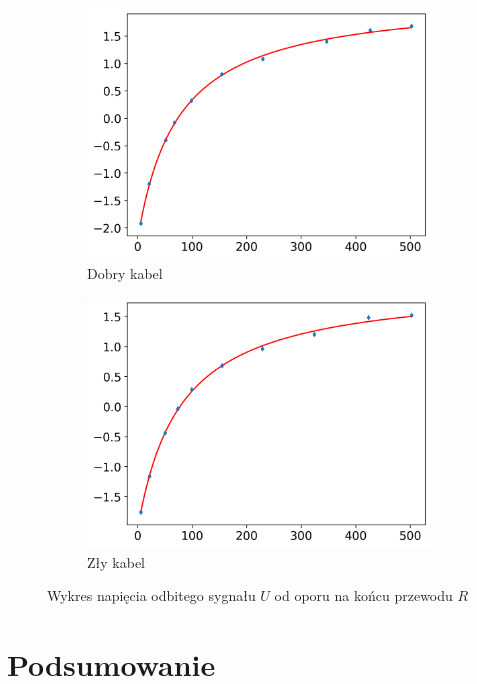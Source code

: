 \documentclass[12pt]{article}
\begin{document}
\begin{figure}[H]
  \centering
  \begin{subfigure}{0.45\textwidth}
    \includegraphics[width=\linewidth]{good_cable_voltage}
    \caption{Dobry kabel}
    \label{fig:good_distance}
  \end{subfigure}\hfill
  \begin{subfigure}{0.45\textwidth}
    \includegraphics[width=\linewidth]{bad_cable_voltage}
    \caption{Zły kabel}
    \label{fig:bad_distance}
  \end{subfigure}
  \caption{Wykres napięcia odbitego sygnału \(U\) od oporu na końcu przewodu \(R\)}
  \label{fig:distance}
\end{figure}

\section{Podsumowanie}
\end{document}
